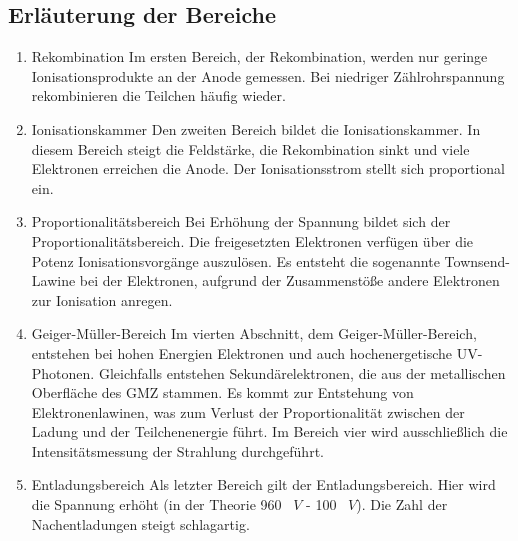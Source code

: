 \subsection{Erläuterung der Bereiche}
\begin{enumerate}
  \renewcommand{\labelenumi}{\roman{enumi}}
  \item Rekombination
  Im ersten Bereich, der Rekombination, werden nur geringe Ionisationsprodukte an der Anode gemessen.
  Bei niedriger Zählrohrspannung rekombinieren die Teilchen häufig wieder. \\
  \item Ionisationskammer
  Den zweiten Bereich bildet die Ionisationskammer.
  In diesem Bereich steigt die Feldstärke, die Rekombination sinkt und viele Elektronen erreichen die Anode.
  Der Ionisationsstrom stellt sich proportional ein. \\
  \item Proportionalitätsbereich
  Bei Erhöhung der Spannung bildet sich der Proportionalitätsbereich.
  Die freigesetzten Elektronen verfügen über die Potenz Ionisationsvorgänge auszulösen.
  Es entsteht die sogenannte Townsend-Lawine bei der Elektronen, aufgrund der Zusammenstöße andere Elektronen zur Ionisation anregen. \\
  \item Geiger-Müller-Bereich
  Im vierten Abschnitt, dem Geiger-Müller-Bereich, entstehen bei hohen Energien Elektronen und auch hochenergetische UV-Photonen.
  Gleichfalls entstehen Sekundärelektronen, die aus der metallischen Oberfläche des GMZ stammen.
  Es kommt zur Entstehung von Elektronenlawinen, was zum Verlust der Proportionalität zwischen der Ladung und der Teilchenenergie führt.
  Im Bereich vier wird ausschließlich die Intensitätsmessung der Strahlung durchgeführt. \\
  \item Entladungsbereich
  Als letzter Bereich gilt der Entladungsbereich.
  Hier wird die Spannung erhöht (in der Theorie 960 \ ${V}$ - 100 \ ${V}$).
  Die Zahl der Nachentladungen steigt schlagartig.
\end{enumerate}
